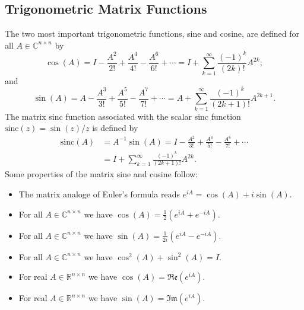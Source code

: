 \subsection{Trigonometric Matrix Functions}
\label{sec:trigonometricmatrixfunctions}

The two most important trigonometric functions, sine and cosine, are defined
\cite{higham2008functions} for all $A \in \mathbb{C}^{n \times n}$ by
\begin{equation}
    \label{eq:matrixcosinedefinition}
    \cos(A) = I - \frac{A^2}{2!} + \frac{A^4}{4!} - \frac{A^6}{6!} + \cdots
    = I + \sum_{k=1}^{\infty}{\frac{(-1)^k}{(2k)!} A^{2k}};
\end{equation}
and
\begin{equation}
    \label{eq:matrixsinedefinition}
    \sin(A) = A - \frac{A^3}{3!} + \frac{A^5}{5!} - \frac{A^7}{7!} + \cdots
    = A + \sum_{k=1}^{\infty}{\frac{(-1)^k}{(2k+1)!} A^{2k+1}}.
\end{equation}
The matrix sinc function associated with the scalar sinc function
$\mathrm{sinc}(z) = \sin(z) / z$ is defined by
\begin{equation}
    \label{eq:matrixsincdefinition}
    \begin{aligned}
        \mathrm{sinc}(A) & = A^{-1} \sin(A)
        = I - \frac{A^2}{3!} + \frac{A^4}{5!} - \frac{A^6}{7!} + \cdots \\
        & = I + \sum_{k=1}^{\infty}{\frac{(-1)^k}{(2k+1)!} A^{2k}}.
    \end{aligned}
\end{equation}
Some properties of the matrix sine and cosine follow:
\begin{itemize}
    \item The matrix analoge of Euler's formula reads $e^{iA} = \cos(A) + i \sin(A)$.
    \item For all $A \in \mathbb{C}^{n \times n}$ we have $\cos(A) = \frac{1}{2} (e^{iA} + e^{-iA})$.
    \item For all $A \in \mathbb{C}^{n \times n}$ we have $\sin(A) = \frac{1}{2i} (e^{iA} - e^{-iA})$.
    \item For all $A \in \mathbb{C}^{n \times n}$ we have $\cos^2(A) + \sin^2(A) = I$.
    \item For real $A \in \mathbb{R}^{n \times n}$ we have $\cos(A) = \mathfrak{Re}(e^{iA})$.
    \item For real $A \in \mathbb{R}^{n \times n}$ we have $\sin(A) = \mathfrak{Im}(e^{iA})$.
\end{itemize}


